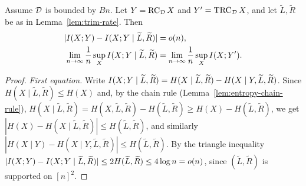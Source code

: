 \begin{lemma}
  \label{lem:claim-mutual-info}
  Assume $\mathcal{D}$ is bounded by $Bn$. Let $Y=\mathrm{RC}_{\mathcal{D}}\,X$ and $Y'=\mathrm{TRC}_{\mathcal{D}}\,X$,
  and let $\widetilde L,\widetilde R$ be as in Lemma~\ref{lem:trim-rate}. Then
  \begin{align}
    |I(X;Y)-I(X;Y\mid\widetilde L,\widetilde R)| &= o(n), \\
    \lim_{n\to\infty}\frac1n\sup_X I(X;Y\mid\widetilde L,\widetilde R)
      &= \lim_{n\to\infty}\frac1n\sup_X I(X;Y').
  \end{align}
\end{lemma}
\begin{proof}
  \emph{First equation.} Write
  $I(X;Y\mid\widetilde L,\widetilde R)=H(X\mid\widetilde L,\widetilde R)
   -H(X\mid Y,\widetilde L,\widetilde R)$. Since $H(X\mid\widetilde L,\widetilde R)
   \le H(X)$ and, by the chain rule (Lemma~\ref{lem:entropy-chain-rule}),
  $H(X\mid\widetilde L,\widetilde R)=H(X,\widetilde L,\widetilde R)
   -H(\widetilde L,\widetilde R)\ge H(X)-H(\widetilde L,\widetilde R)$, we get
  $|H(X)-H(X\mid\widetilde L,\widetilde R)|\le H(\widetilde L,\widetilde R)$, and
  similarly $|H(X\mid Y)-H(X\mid Y,\widetilde L,\widetilde R)|\le
  H(\widetilde L,\widetilde R)$. By the triangle inequality
  $|I(X;Y)-I(X;Y\mid\widetilde L,\widetilde R)|\le 2H(\widetilde L,\widetilde R)
   \le 4\log n=o(n)$, since $(\widetilde L,\widetilde R)$ is supported on $[n]^2$.


\end{proof}
